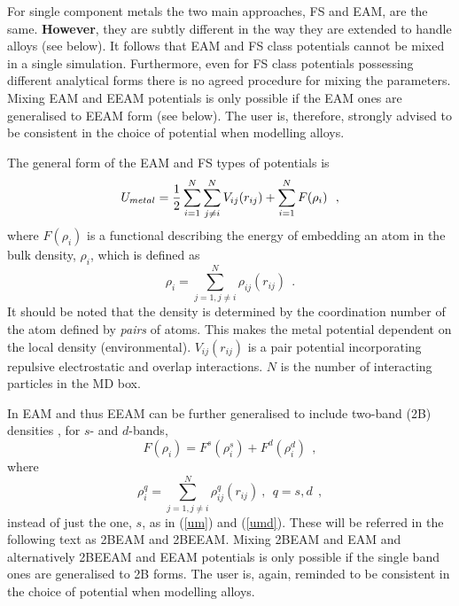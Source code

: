 For single component metals the two main approaches, FS and EAM, are the same.
{\bf However}, they are subtly different in the way they are extended to
handle alloys (see below).  It follows that EAM and FS class potentials
cannot be mixed in a single simulation.  Furthermore, even for FS
class potentials possessing different analytical forms there is no
agreed procedure for mixing the parameters.  Mixing EAM and EEAM
potentials is only possible if the EAM ones are generalised to EEAM
form (see below).  The user is, therefore, strongly advised to be
consistent in the choice of potential when modelling alloys.

The general form of the EAM and FS types of potentials is \cite{friedel-52a}
\begin{equation}
U_{metal} = {1 \over 2} \sum_{i=1}^{N} \sum_{j \ne i}^{N} V_{ij}(r_{ij}) +
\sum_{i=1}^{N} F(\rho_{i})~~, \label{um}
\end{equation}
where $F(\rho_{i})$ is a functional describing the energy of embedding
an atom in the bulk density, $\rho_{i}$, which is defined as
\begin{equation}
\rho_{i} = \sum_{j=1, j \ne i}^{N} \rho_{ij}(r_{ij})~~. \label{umd}
\end{equation}
It should be noted that the density is determined by the coordination
number of the atom defined by {\em pairs} of atoms.  This makes the
metal potential dependent on the local density (environmental).
$V_{ij}(r_{ij})$ is a pair potential incorporating repulsive
electrostatic and overlap interactions.  $N$ is the number of
interacting particles in the MD box.

In \D EAM and thus EEAM can be further generalised to include two-band
(2B) densities \cite{ackland-03a,ollson-05a}, for $s$- and $d$-bands,
\begin{equation}
F(\rho_{i})=F^{s}(\rho^{s}_{i})+F^{d}(\rho^{d}_{i})~~, \label{2b}
\end{equation}
where
\begin{equation}
\rho^{q}_{i} = \sum_{j=1, j \ne i}^{N} \rho^{q}_{ij}(r_{ij})~,~~q=s,d~~, \label{2umd}
\end{equation}
instead of just the one, $s$, as in (\ref{um}) and (\ref{umd}).
These will be referred in the following text as 2BEAM and 2BEEAM.
Mixing 2BEAM and EAM and alternatively 2BEEAM and EEAM potentials
is only possible if the single band ones are generalised to 2B forms.
The user is, again, reminded to be consistent in the choice of
potential when modelling alloys.

